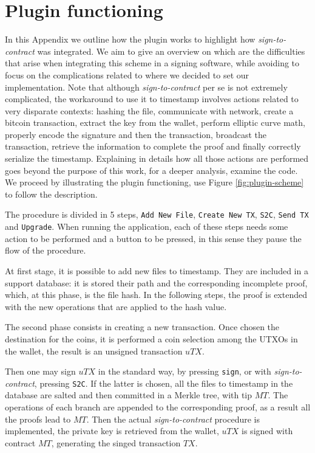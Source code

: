 \chapter{Plugin functioning}
\label{app:B}
In this Appendix we outline how the plugin works to highlight how \textit{sign-to-contract} was integrated.
We aim to give an overview on which are the difficulties that arise when integrating this scheme in a signing software, while avoiding to focus on the complications related to where we decided to set our implementation.
Note that although \textit{sign-to-contract} per se is not extremely complicated, the workaround to use it to timestamp involves actions related to very disparate contexts: hashing the file, communicate with network, create a bitcoin transaction, extract the key from the wallet, perform elliptic curve math, properly encode the signature and then the transaction, broadcast the transaction, retrieve the information to complete the proof and finally correctly serialize the timestamp.
Explaining in details how all those actions are performed goes beyond the purpose of this work, for a deeper analysis, examine the code. We proceed by illustrating the plugin functioning, use Figure \ref{fig:plugin-scheme} to follow the description. 

The procedure is divided in 5 steps, \verb|Add New File|, \verb|Create New TX|, \verb|S2C|, \verb|Send TX| and \verb|Upgrade|. 
When running the application, each of these steps needs some action to be performed and a button to be pressed, in this sense they pause the flow of the procedure.

At first stage, it is possible to add new files to timestamp. 
They are included in a support database: it is stored their path and the corresponding incomplete proof, which, at this phase, is the file hash. 
In the following steps, the proof is extended with the new operations that are applied to the hash value.

The second phase consists in creating a new transaction. 
Once chosen the destination for the coins, it is performed a coin selection among the UTXOs in the wallet, the result is an unsigned transaction $uTX$. 

Then one may sign $uTX$ in the standard way, by pressing \verb|sign|, or with \textit{sign-to-contract}, pressing \verb|S2C|. 
If the latter is chosen, all the files to timestamp in the database are salted and then committed in a Merkle tree, with tip $MT$.
The operations of each branch are appended to the corresponding proof, as a result all the proofs lead to $MT$.
Then the actual \textit{sign-to-contract} procedure is implemented, the private key is retrieved from the wallet, $uTX$ is signed with contract $MT$, generating the singed transaction $TX$.

